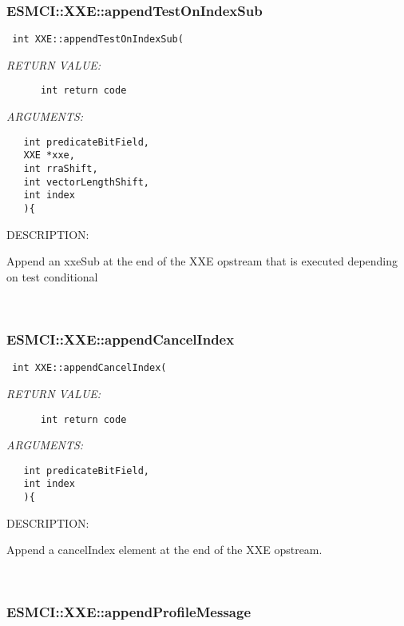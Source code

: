 \subsubsection [ESMCI::XXE::appendTestOnIndexSub] {ESMCI::XXE::appendTestOnIndexSub}


  
\begin{verbatim} int XXE::appendTestOnIndexSub(\end{verbatim}{\em RETURN VALUE:}
\begin{verbatim}      int return code\end{verbatim}{\em ARGUMENTS:}
\begin{verbatim}   int predicateBitField,
   XXE *xxe,
   int rraShift,
   int vectorLengthShift,
   int index
   ){\end{verbatim}
{\sf DESCRIPTION:\\ }


    Append an xxeSub at the end of the XXE opstream that is executed depending
    on test conditional 
 
\mbox{}\hrulefill\
 
\subsubsection [ESMCI::XXE::appendCancelIndex] {ESMCI::XXE::appendCancelIndex}


  
\begin{verbatim} int XXE::appendCancelIndex(\end{verbatim}{\em RETURN VALUE:}
\begin{verbatim}      int return code\end{verbatim}{\em ARGUMENTS:}
\begin{verbatim}   int predicateBitField,
   int index
   ){\end{verbatim}
{\sf DESCRIPTION:\\ }


    Append a cancelIndex element at the end of the XXE opstream. 
 
\mbox{}\hrulefill\
 
\subsubsection [ESMCI::XXE::appendProfileMessage] {ESMCI::XXE::appendProfileMessage}


